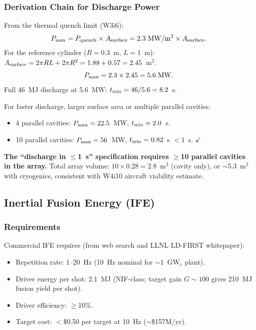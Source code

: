 \documentclass[11pt]{article}
\begin{document}
\subsubsection{Derivation Chain for Discharge Power}

From the thermal quench limit (W3i6):
\begin{equation}
P_{\rm max} = P_{\rm quench} \times A_{\rm surface}
= 2.3\;\mathrm{MW/m^2} \times A_{\rm surface}.
\end{equation}
For the reference cylinder ($R = 0.3$~m, $L = 1$~m):
$A_{\rm surface} = 2\pi R L + 2\pi R^2 = 1.88 + 0.57 = 2.45$~m$^2$.
\begin{equation}
P_{\rm max} = 2.3 \times 2.45 = 5.6\;\mathrm{MW}.
\end{equation}
Full 46~MJ discharge at 5.6~MW: $t_{\rm min} = 46/5.6 = 8.2$~s.

For faster discharge, larger surface area or multiple parallel cavities:
\begin{itemize}
\item 4 parallel cavities: $P_{\rm max} = 22.5$~MW, $t_{\rm min} = 2.0$~s.
\item 10 parallel cavities: $P_{\rm max} = 56$~MW, $t_{\rm min} = 0.82$~s $< 1$~s. $\checkmark$
\end{itemize}

\textbf{The ``discharge in $\leq$1~s'' specification requires
$\geq$10 parallel cavities in the array.} Total array volume:
$10 \times 0.28 = 2.8$~m$^3$ (cavity only), or $\sim$5.3~m$^3$
with cryogenics, consistent with W4i10 aircraft viability estimate.

\subsection{Inertial Fusion Energy (IFE)}\label{sec:ife}

\subsubsection{Requirements}

Commercial IFE requires (from web search and LLNL LD-FIRST whitepaper):
\begin{itemize}
\item Repetition rate: 1--20~Hz (10~Hz nominal for $\sim$1~GW$_e$ plant).
\item Driver energy per shot: 2.1~MJ (NIF-class; target gain $G \sim 100$
  gives 210~MJ fusion yield per shot).
\item Driver efficiency: $\geq$10\%.
\item Target cost: $<$\$0.50 per target at 10~Hz ($\sim$\$157M/yr).
\end{itemize}
\end{document}
